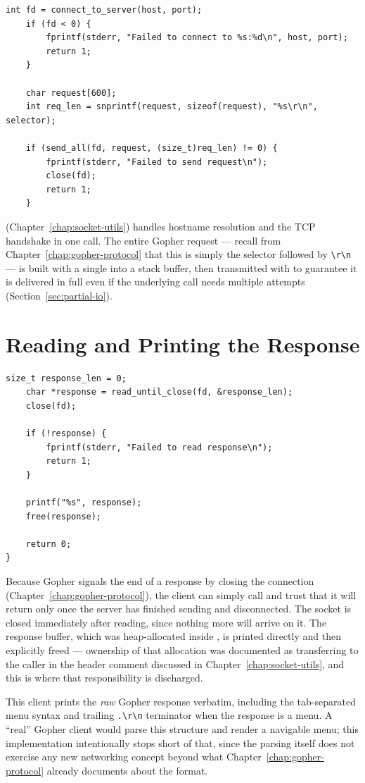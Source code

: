 \begin{lstlisting}[style=cstyle]
    int fd = connect_to_server(host, port);
    if (fd < 0) {
        fprintf(stderr, "Failed to connect to %s:%d\n", host, port);
        return 1;
    }

    char request[600];
    int req_len = snprintf(request, sizeof(request), "%s\r\n", selector);

    if (send_all(fd, request, (size_t)req_len) != 0) {
        fprintf(stderr, "Failed to send request\n");
        close(fd);
        return 1;
    }
\end{lstlisting}

 (Chapter~\ref{chap:socket-utils}) handles hostname resolution and the TCP handshake in one call. The entire Gopher request --- recall from Chapter~\ref{chap:gopher-protocol} that this is simply the selector followed by \texttt{\textbackslash r\textbackslash n} --- is built with a single  into a stack buffer, then transmitted with  to guarantee it is delivered in full even if the underlying  call needs multiple attempts (Section~\ref{sec:partial-io}).

\section{Reading and Printing the Response}

\begin{lstlisting}[style=cstyle]
    size_t response_len = 0;
    char *response = read_until_close(fd, &response_len);
    close(fd);

    if (!response) {
        fprintf(stderr, "Failed to read response\n");
        return 1;
    }

    printf("%s", response);
    free(response);

    return 0;
}
\end{lstlisting}

Because Gopher signals the end of a response by closing the connection (Chapter~\ref{chap:gopher-protocol}), the client can simply call  and trust that it will return only once the server has finished sending and disconnected. The socket is closed immediately after reading, since nothing more will arrive on it. The response buffer, which was heap-allocated inside , is printed directly and then explicitly freed --- ownership of that allocation was documented as transferring to the caller in the header comment discussed in Chapter~\ref{chap:socket-utils}, and this is where that responsibility is discharged.

\begin{note}
This client prints the \emph{raw} Gopher response verbatim, including the tab-separated menu syntax and trailing \texttt{.\textbackslash r\textbackslash n} terminator when the response is a menu. A ``real'' Gopher client would parse this structure and render a navigable menu; this implementation intentionally stops short of that, since the parsing itself does not exercise any new networking concept beyond what Chapter~\ref{chap:gopher-protocol} already documents about the format.
\end{note}
